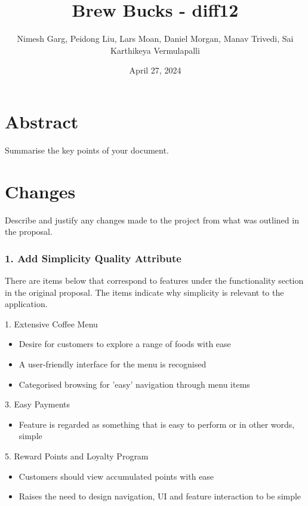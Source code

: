 \documentclass{article}
\title{Brew Bucks - diff12}
\author{Nimesh Garg, Peidong Liu, Lars Moan, Daniel Morgan, Manav Trivedi, Sai Karthikeya Vermulapalli}
\date{April 27, 2024}
\begin{document}
\maketitle
\pagebreak

\tableofcontents
\pagebreak

\section{Abstract}
Summarise the key points of your document.
\section{Changes}
Describe and justify any changes made to the project from what was outlined in the proposal.

\subsubsection*{1. Add Simplicity Quality Attribute}
There are items below that correspond to features under the functionality section in the original proposal. The items indicate why simplicity is relevant to the application.

\medskip \begin{minipage}{\dimexpr\textwidth-0.25cm}
1. Extensive Coffee Menu 
\begin{itemize}
    \item Desire for customers to explore a range of foods with ease
    \item A user-friendly interface for the menu is recognised
    \item Categorised browsing for 'easy' navigation through menu items
\end{itemize}

3. Easy Payments
\begin{itemize}
    \item Feature is regarded as something that is easy to perform or in other words, simple
\end{itemize}

5. Reward Points and Loyalty Program
\begin{itemize}
    \item Customers should view accumulated points with ease
    \item Raises the need to design navigation, UI and feature interaction to be simple
\end{itemize}
\end{minipage}
\end{document}
